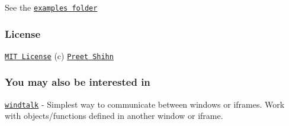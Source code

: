 See the \href{https://github.com/pshihn/workly/tree/master/examples}{\tt examples folder}

\subsubsection*{License}

\href{https://github.com/pshihn/workly/blob/master/LICENSE}{\tt M\+IT License} (c) \href{https://twitter.com/preetster}{\tt Preet Shihn}

\subsubsection*{You may also be interested in}

\href{https://github.com/pshihn/windtalk}{\tt windtalk} -\/ Simplest way to communicate between windows or iframes. Work with objects/functions defined in another window or iframe. 